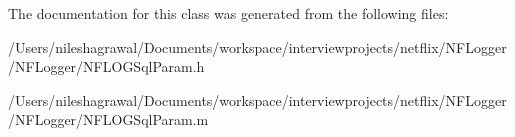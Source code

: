 The documentation for this class was generated from the following files\+:\begin{DoxyCompactItemize}
\item 
/\+Users/nileshagrawal/\+Documents/workspace/interviewprojects/netflix/\+N\+F\+Logger/\+N\+F\+Logger/N\+F\+L\+O\+G\+Sql\+Param.\+h\item 
/\+Users/nileshagrawal/\+Documents/workspace/interviewprojects/netflix/\+N\+F\+Logger/\+N\+F\+Logger/N\+F\+L\+O\+G\+Sql\+Param.\+m\end{DoxyCompactItemize}
